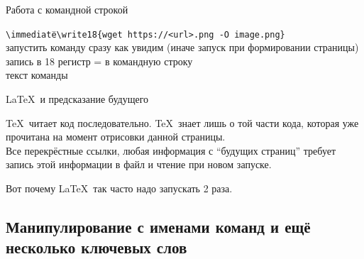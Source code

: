 \begin{frame}[fragile]{Работа с командной строкой\magicPage}\relax
    \footnotesize
    \begin{tabbing} 
        \lstinline|\immediate|\= \lstinline|\write18|\= \lstinline|{wget https://<url>.png -O image.png}|\\ 
        \footnotesize запустить команду сразу как увидим \tiny(иначе запуск при формировании страницы) \> \> \\ 
        \> \footnotesize запись в 18 регистр = в командную строку \> \\
        \> \> \footnotesize текст команды \\ 
    \end{tabbing}

    \cprotect{}
\end{frame}

\begin{frame}{\LaTeX\ и предсказание будущего}\relax

\TeX\ читает код последовательно. \TeX\ знает лишь о той части кода, которая уже прочитана на момент отрисовки данной страницы.\\

Все перекрёстные ссылки, любая информация с ``будущих страниц'' требует запись этой информации в файл и чтение при новом запуске.

Вот почему \LaTeX\ так часто надо запускать 2 раза.
    
\end{frame}

\subsection{Манипулирование с именами команд и ещё несколько ключевых слов}


